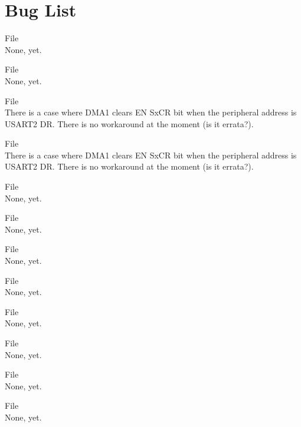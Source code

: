 \chapter{Bug List}
\hypertarget{bug}{}\label{bug}

\begin{DoxyRefList}
\item[File \doxylink{adc_8c}{adc.c} ]\hfill \\
\label{bug__bug000001}%
%
None, yet.  
\item[File \doxylink{adc_8h}{adc.h} ]\hfill \\
\label{bug__bug000002}%
%
None, yet.  
\item[File \doxylink{dma_8c}{dma.c} ]\hfill \\
\label{bug__bug000003}%
%
There is a case where DMA1 clears EN Sx\+CR bit when the peripheral address is USART2 DR. There is no workaround at the moment (is it errata?).  
\item[File \doxylink{dma_8h}{dma.h} ]\hfill \\
\label{bug__bug000004}%
%
There is a case where DMA1 clears EN Sx\+CR bit when the peripheral address is USART2 DR. There is no workaround at the moment (is it errata?).  
\item[File \doxylink{gpio_8c}{gpio.c} ]\hfill \\
\label{bug__bug000005}%
%
None, yet.  
\item[File \doxylink{gpio_8h}{gpio.h} ]\hfill \\
\label{bug__bug000006}%
%
None, yet.  
\item[File \doxylink{interrupts_8c}{interrupts.c} ]\hfill \\
\label{bug__bug000007}%
%
None, yet.  
\item[File \doxylink{interrupts_8h}{interrupts.h} ]\hfill \\
\label{bug__bug000008}%
%
None, yet.  
\item[File \doxylink{mcu__init_8c}{mcu\+\_\+init.c} ]\hfill \\
\label{bug__bug000009}%
%
None, yet.  
\item[File \doxylink{mcu__init_8h}{mcu\+\_\+init.h} ]\hfill \\
\label{bug__bug000010}%
%
None, yet.  
\item[File \doxylink{usart_8c}{usart.c} ]\hfill \\
\label{bug__bug000011}%
%
None, yet.  
\item[File \doxylink{usart_8h}{usart.h} ]\hfill \\
\label{bug__bug000012}%
%
None, yet. 
\end{DoxyRefList}